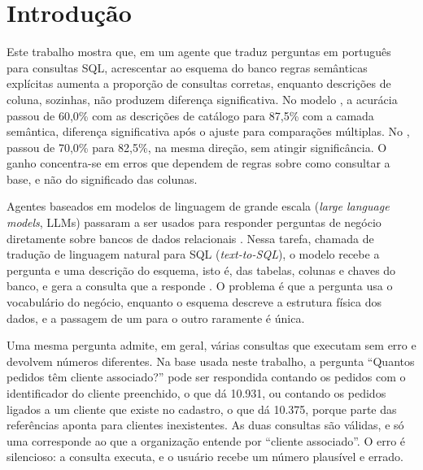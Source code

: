 \chapter{Introdução}
\label{cap:introducao}

Este trabalho mostra que, em um agente que traduz perguntas em português
para consultas SQL, acrescentar ao esquema do banco regras semânticas
explícitas aumenta a proporção de consultas corretas, enquanto descrições
de coluna, sozinhas, não produzem diferença significativa. No modelo
, a acurácia passou de 60,0\% com as descrições de
catálogo para 87,5\% com a camada semântica, diferença significativa após
o ajuste para comparações múltiplas. No , passou de
70,0\% para 82,5\%, na mesma direção, sem atingir significância. O ganho
concentra-se em erros que dependem de regras sobre como consultar a base,
e não do significado das colunas.

Agentes baseados em modelos de linguagem de grande escala
(\textit{large language models}, LLMs) passaram a ser usados para
responder perguntas de negócio diretamente sobre bancos de dados
relacionais \cite{wang2024agents,hong2024survey}. Nessa tarefa, chamada de
tradução de linguagem natural para SQL (\textit{text-to-SQL}), o modelo
recebe a pergunta e uma descrição do esquema, isto é, das tabelas, colunas
e chaves do banco, e gera a consulta que a responde
\cite{shi2024survey,liu2025survey}. O problema
é que a pergunta usa o vocabulário do negócio, enquanto o esquema descreve
a estrutura física dos dados, e a passagem de um para o outro raramente é
única.

Uma mesma pergunta admite, em geral, várias consultas que executam sem
erro e devolvem números diferentes. Na base usada neste trabalho, a
pergunta ``Quantos pedidos têm cliente associado?'' pode ser respondida
contando os pedidos com o identificador do cliente preenchido, o que dá
10.931, ou contando os pedidos ligados a um cliente que existe no
cadastro, o que dá 10.375, porque parte das referências aponta para
clientes inexistentes. As duas consultas são válidas, e só uma
corresponde ao que a organização entende por ``cliente associado''. O erro
é silencioso: a consulta executa, e o usuário recebe um número plausível e
errado.


